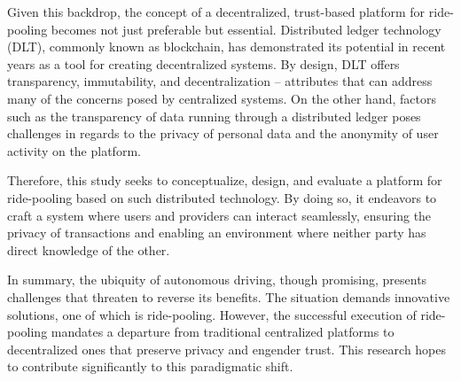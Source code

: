 Given this backdrop, the concept of a decentralized, trust-based platform for ride-pooling becomes not just preferable but essential. Distributed ledger technology (DLT), commonly known as blockchain, has demonstrated its potential in recent years as a tool for creating decentralized systems. By design, DLT offers transparency, immutability, and decentralization – attributes that can address many of the concerns posed by centralized systems. On the other hand, factors such as the  transparency of data running through a distributed ledger poses challenges in regards to the privacy of personal data and the anonymity of user activity on the platform.

Therefore, this study seeks to conceptualize, design, and evaluate a platform for ride-pooling based on such distributed technology. By doing so, it endeavors to craft a system where users and providers can interact seamlessly, ensuring the privacy of transactions and enabling an environment where neither party has direct knowledge of the other.

In summary, the ubiquity of autonomous driving, though promising, presents challenges that threaten to reverse its benefits. The situation demands innovative solutions, one of which is ride-pooling. However, the successful execution of ride-pooling mandates a departure from traditional centralized platforms to decentralized ones that preserve privacy and engender trust. This research hopes to contribute significantly to this paradigmatic shift.




